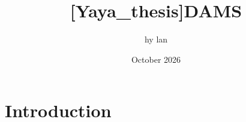 \documentclass{article}
\title{[Yaya_thesis]DAMS}
\author{hy lan}
\date{October 2026}
\begin{document}
\maketitle

\section{Introduction}
\end{document}
